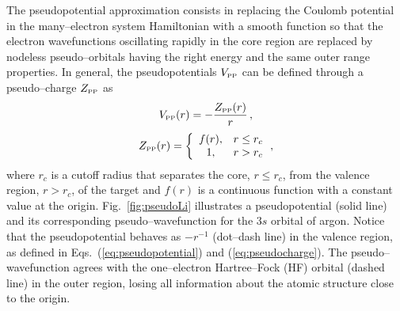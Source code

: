 \documentclass[10pt]{article}
\begin{document}
The pseudopotential approximation consists in replacing the Coulomb 
potential in the many--electron system Hamiltonian with a smooth 
function so that the electron wavefunctions oscillating rapidly in 
the core region are replaced by nodeless pseudo--orbitals having the 
right energy and the same outer range properties.
In general, the pseudopotentials $V_{\mbox{\tiny PP}}$ can be defined 
through a pseudo--charge $Z_{\mbox{\tiny PP}}$ as
\begin{equation}
 V_{\mbox{\tiny PP}}(r)=-\frac{Z_{\mbox{\tiny PP}}(r)}{r} \,,
 \label{eq:pseudopotential}
\end{equation}
\begin{equation}
 Z_{\mbox{\tiny PP}}(r)=\bigg\{
 \begin{array}{cl}
  f(r), & r\leq r_c \\
  1, & r>r_c 
 \end{array} 
 \,,
 \label{eq:pseudocharge}
\end{equation}
where $r_c$ is a cutoff radius that separates the core, $r\leq r_c$,
from the valence region, $r>r_c$, of the target and $f(r)$ is a 
continuous function with a constant value at the origin.
Fig.~\ref{fig:pseudoLi} illustrates a pseudopotential (solid line)
and its corresponding pseudo--wavefunction for the $3s$ orbital of 
argon. Notice that the pseudopotential behaves as $-r^{-1}$ 
(dot--dash line) in the valence region, as defined in 
Eqs.~(\ref{eq:pseudopotential}) and (\ref{eq:pseudocharge}).
The pseudo--wavefunction agrees with the one--electron Hartree--Fock
(HF) orbital (dashed line) in the outer region, losing all 
information about the atomic structure close to the origin.
\end{document}
